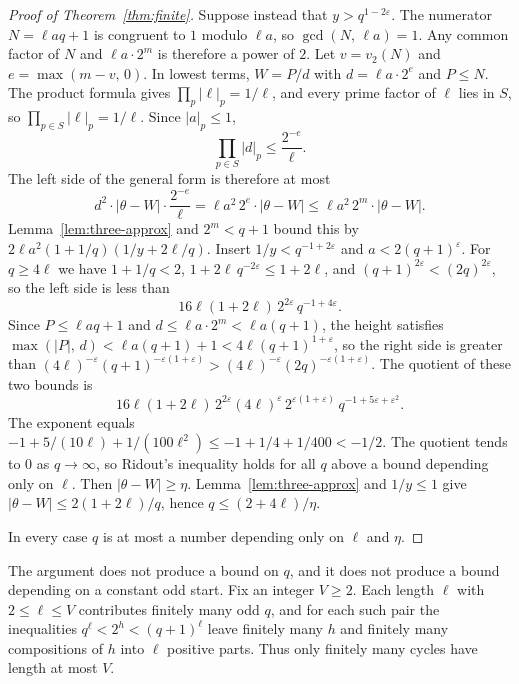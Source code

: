 \documentclass[11pt]{article}
\begin{document}
\begin{proof}[Proof of Theorem~\ref{thm:finite}]
Suppose instead that $y > q^{1-2\varepsilon}$.
The numerator $N = \ell aq + 1$ is congruent to $1$ modulo $\ell a$, so $\gcd(N,\, \ell a) = 1$.
Any common factor of $N$ and $\ell a \cdot 2^m$ is therefore a power of $2$.
Let $v = v_2(N)$ and $e = \max(m - v,\, 0)$.
In lowest terms, $W = P/d$ with $d = \ell a \cdot 2^e$ and $P \le N$.
The product formula gives $\prod_p \lvert \ell \rvert_p = 1/\ell$, and every prime factor of $\ell$ lies in $S$, so $\prod_{p \in S} \lvert \ell \rvert_p = 1/\ell$.
Since $\lvert a \rvert_p \le 1$,
\[
\prod_{p \in S} \lvert d \rvert_p \le \frac{2^{-e}}{\ell}.
\]
The left side of the general form is therefore at most
\[
d^2 \cdot \lvert \theta - W \rvert \cdot \frac{2^{-e}}{\ell} = \ell a^2\, 2^e \cdot \lvert \theta - W \rvert \le \ell a^2\, 2^m \cdot \lvert \theta - W \rvert.
\]
Lemma~\ref{lem:three-approx} and $2^m < q+1$ bound this by $2\ell a^2(1 + 1/q)(1/y + 2\ell/q)$.
Insert $1/y < q^{-1+2\varepsilon}$ and $a < 2(q+1)^\varepsilon$.
For $q \ge 4\ell$ we have $1 + 1/q < 2$, $1 + 2\ell\, q^{-2\varepsilon} \le 1 + 2\ell$, and $(q+1)^{2\varepsilon} < (2q)^{2\varepsilon}$, so the left side is less than
\[
16\ell(1+2\ell)\, 2^{2\varepsilon}\, q^{-1+4\varepsilon}.
\]
Since $P \le \ell aq + 1$ and $d \le \ell a \cdot 2^m < \ell a(q+1)$, the height satisfies $\max(\lvert P \rvert,\, d) < \ell a(q+1) + 1 < 4\ell(q+1)^{1+\varepsilon}$, so the right side is greater than $(4\ell)^{-\varepsilon}(q+1)^{-\varepsilon(1+\varepsilon)} > (4\ell)^{-\varepsilon}(2q)^{-\varepsilon(1+\varepsilon)}$.
The quotient of these two bounds is
\[
16\ell(1+2\ell)\, 2^{2\varepsilon}(4\ell)^\varepsilon\, 2^{\varepsilon(1+\varepsilon)}\, q^{-1+5\varepsilon+\varepsilon^2}.
\]
The exponent equals $-1 + 5/(10\ell) + 1/(100\ell^2) \le -1 + 1/4 + 1/400 < -1/2$.
The quotient tends to $0$ as $q \to \infty$, so Ridout's inequality holds for all $q$ above a bound depending only on $\ell$.
Then $\lvert \theta - W \rvert \ge \eta$.
Lemma~\ref{lem:three-approx} and $1/y \le 1$ give $\lvert \theta - W \rvert \le 2(1+2\ell)/q$, hence $q \le (2+4\ell)/\eta$.

In every case $q$ is at most a number depending only on $\ell$ and $\eta$.
\end{proof}

The argument does not produce a bound on $q$, and it does not produce a bound depending on a constant odd start.
Fix an integer $V \ge 2$.
Each length $\ell$ with $2 \le \ell \le V$ contributes finitely many odd $q$, and for each such pair the inequalities $q^\ell < 2^h < (q+1)^\ell$ leave finitely many $h$ and finitely many compositions of $h$ into $\ell$ positive parts.
Thus only finitely many cycles have length at most $V$.
\end{document}
